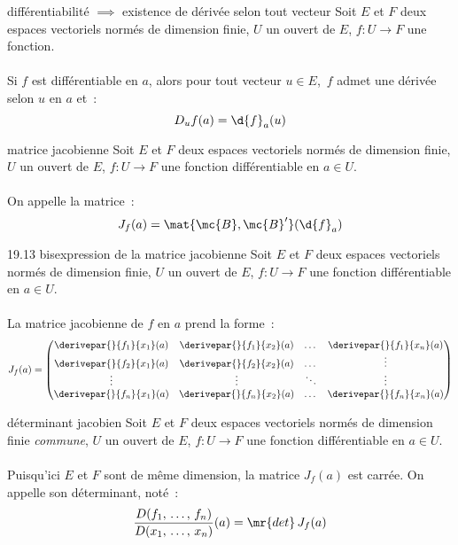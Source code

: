 \begin{theoreme}{19.9}{différentiabilité $\implies$ existence de dérivée selon tout vecteur}
    Soit $E$ et $F$ deux espaces vectoriels normés de dimension finie, $U$ un ouvert de $E$, $f:U\to F$ une fonction.\\\\
    Si $f$ est différentiable en $a$, alors pour tout vecteur $u \in E$,\, $f$ admet une dérivée selon $u$ en $a$ et~:
    $$D_uf(a) = \d{f}_a(u)$$
\end{theoreme}

\begin{definition}{19.13}{matrice jacobienne}
    Soit $E$ et $F$ deux espaces vectoriels normés de dimension finie, $U$ un ouvert de $E$, $f:U\to F$ une fonction différentiable en $a \in U$.\\\\
    On appelle  la matrice~:
    $$J_f(a) = \mat{\mc{B},\mc{B}'}(\d{f}_a)$$
\end{definition}

\begin{proposition}{19.13 bis}{expression de la matrice jacobienne}
    Soit $E$ et $F$ deux espaces vectoriels normés de dimension finie, $U$ un ouvert de $E$, $f:U\to F$ une fonction différentiable en $a \in U$.\\\\
    La matrice jacobienne de $f$ en $a$ prend la forme~:
    $$J_f(a) = \begin{pmatrix}
        \displaystyle\derivepar{}{f_1}{x_1}(a) & \displaystyle \derivepar{}{f_1}{x_2}(a) & \displaystyle \dots & \displaystyle \derivepar{}{f_1}{x_n}(a)\\
        \displaystyle\derivepar{}{f_2}{x_1}(a) & \displaystyle \derivepar{}{f_2}{x_2}(a) & \displaystyle \dots & \displaystyle \vdots\\
        \displaystyle\vdots & \displaystyle \vdots & \displaystyle \ddots & \displaystyle \vdots\\
        \displaystyle\derivepar{}{f_n}{x_1}(a) & \displaystyle \derivepar{}{f_n}{x_2}(a ) & \displaystyle \dots & \displaystyle \derivepar{}{f_n}{x_n}(a)
    \end{pmatrix}$$ 
\end{proposition}

\begin{definition}{19.14}{déterminant jacobien}
    Soit $E$ et $F$ deux espaces vectoriels normés de dimension finie \textit{commune}, $U$ un ouvert de $E$, $f:U\to F$ une fonction différentiable en $a \in U$.\\\\
    Puisqu'ici $E$ et $F$ sont de même dimension, la matrice $J_f(a)$ est carrée. On appelle  son déterminant, noté~:
    $$\frac{D(f_1,\, \dots,\, f_n)}{D(x_1,\, \dots,\, x_n)}(a) = \mr{det}\,J_f(a)$$
\end{definition}

